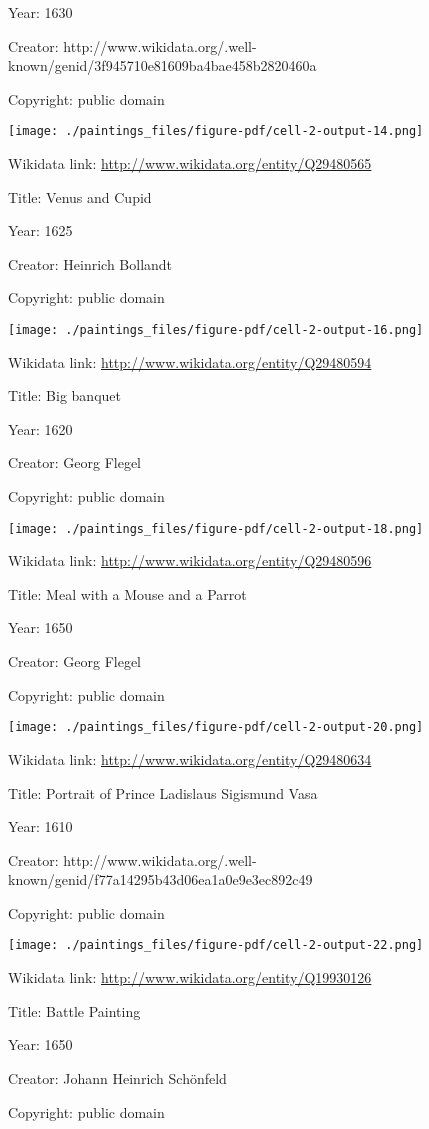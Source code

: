 \documentclass[
  letterpaper,
]{book}
\begin{document}
Year: 1630

Creator:
http://www.wikidata.org/.well-known/genid/3f945710e81609ba4bae458b2820460a

Copyright: public domain

\texttt{[image: ./paintings\_files/figure-pdf/cell-2-output-14.png]}

Wikidata link: \url{http://www.wikidata.org/entity/Q29480565}

Title: Venus and Cupid

Year: 1625

Creator: Heinrich Bollandt

Copyright: public domain

\texttt{[image: ./paintings\_files/figure-pdf/cell-2-output-16.png]}

Wikidata link: \url{http://www.wikidata.org/entity/Q29480594}

Title: Big banquet

Year: 1620

Creator: Georg Flegel

Copyright: public domain

\texttt{[image: ./paintings\_files/figure-pdf/cell-2-output-18.png]}

Wikidata link: \url{http://www.wikidata.org/entity/Q29480596}

Title: Meal with a Mouse and a Parrot

Year: 1650

Creator: Georg Flegel

Copyright: public domain

\texttt{[image: ./paintings\_files/figure-pdf/cell-2-output-20.png]}

Wikidata link: \url{http://www.wikidata.org/entity/Q29480634}

Title: Portrait of Prince Ladislaus Sigismund Vasa

Year: 1610

Creator:
http://www.wikidata.org/.well-known/genid/f77a14295b43d06ea1a0e9e3ec892c49

Copyright: public domain

\texttt{[image: ./paintings\_files/figure-pdf/cell-2-output-22.png]}

Wikidata link: \url{http://www.wikidata.org/entity/Q19930126}

Title: Battle Painting

Year: 1650

Creator: Johann Heinrich Schönfeld

Copyright: public domain
\end{document}
